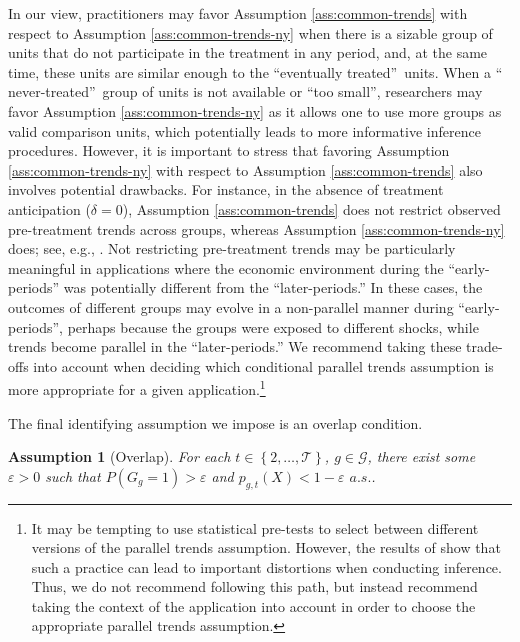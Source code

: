 \documentclass[11pt]{article}%
\theoremstyle{plain}
\newtheorem{assumption}{Assumption}
\numberwithin{sassumption}{section}
\numberwithin{equation}{section}
\begin{document}
In our view, practitioners may favor Assumption \ref{ass:common-trends} with
respect to Assumption \ref{ass:common-trends-ny} when there is a sizable group
of units that do not participate in the treatment in any period, and, at the
same time, these units are similar enough to the \textquotedblleft eventually
treated\textquotedblright\ units. When a \textquotedblleft
never-treated\textquotedblright\ group of units is not available or
\textquotedblleft too small\textquotedblright, researchers may favor
Assumption \ref{ass:common-trends-ny} as it allows one to use more groups as
valid comparison units, which potentially leads to more informative inference
procedures. However, it is important to stress that favoring Assumption
\ref{ass:common-trends-ny} with respect to Assumption \ref{ass:common-trends}
also involves potential drawbacks. For instance, in the absence of treatment
anticipation ($\delta=0$), Assumption \ref{ass:common-trends} does not
restrict observed pre-treatment trends across groups, whereas Assumption
\ref{ass:common-trends-ny} does; see, e.g., \cite{Marcus2020}. Not restricting
pre-treatment trends may be particularly meaningful in applications where the
economic environment during the ``early-periods'' was potentially different
from the ``later-periods.'' In these cases, the outcomes of different groups
may evolve in a non-parallel manner during ``early-periods'', perhaps because
the groups were exposed to different shocks, while trends become parallel in
the ``later-periods.'' We recommend taking these trade-offs into account when
deciding which conditional parallel trends assumption is more appropriate for
a given application.\footnote{It may be tempting to use statistical pre-tests
to select between different versions of the parallel trends assumption.
However, the results of \cite{Roth2020} show that such a practice can lead to
important distortions when conducting inference. Thus, we do not recommend
following this path, but instead recommend taking the context of the
application into account in order to choose the appropriate parallel trends
assumption.}

The final identifying assumption we impose is an overlap condition.

\begin{assumption}
[Overlap]\label{ass:overlap} For each $t\in\left\{  2,\dots,\mathcal{T}%
\right\}  $, $g\in\mathcal{G}$, there exist some $\varepsilon>0$ such that
$P\left(  G_{g}=1\right)  >\varepsilon$ and $p_{g,t}(X)<1-\varepsilon$ $a.s.$.
\end{assumption}
\end{document}
